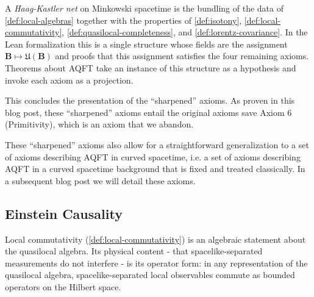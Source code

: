 \begin{definition}
    \label{def:haag-kastler-net}
    \leanok
    A \emph{Haag-Kastler net} on Minkowski spacetime is the bundling of the data of \ref{def:local-algebras} together with the properties of \ref{def:isotony}, \ref{def:local-commutativity}, \ref{def:quasilocal-completeness}, and \ref{def:lorentz-covariance}. In the Lean formalization this is a single structure whose fields are the assignment $\mathbf{B} \mapsto \mathfrak{U}(\mathbf{B})$ and proofs that this assignment satisfies the four remaining axioms. Theorems about AQFT take an instance of this structure as a hypothesis and invoke each axiom as a projection.
\end{definition}

This concludes the presentation of the ``sharpened'' axioms. As proven in this blog post, these ``sharpened'' axioms entail the original axioms save Axiom 6 (Primitivity), which is an axiom that we abandon.

These ``sharpened'' axioms also allow for a straightforward generalization to a set of axioms describing AQFT in curved spacetime, i.e. a set of axioms describing AQFT in a curved spacetime background that is fixed and treated classically. In a subsequent blog post we will detail these axioms.

\subsection{Einstein Causality}

Local commutativity (\ref{def:local-commutativity}) is an algebraic statement about the quasilocal algebra. Its physical content - that spacelike-separated measurements do not interfere - is its operator form: in any representation of the quasilocal algebra, spacelike-separated local observables commute as bounded operators on the Hilbert space.

